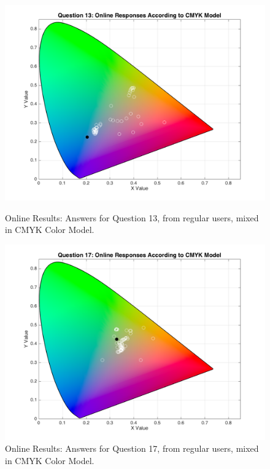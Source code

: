 \begin{figure}[!htbp]
  \centering
  \begin{minipage}{0.48\textwidth}
    \centering
    \includegraphics[width=\textwidth]{images/13_online_CMYKresponses.png}
    \caption[Online Results: Answers for Question 13, from regular users, mixed in CMYK Color Model.]{Online Results: Answers for Question 13, from regular users, mixed in CMYK Color Model.}
    \label{fig:onlinecmykregular_13}
  \end{minipage}\hfill
  \begin{minipage}{0.48\textwidth}
    \centering
    \includegraphics[width=\textwidth]{images/17_online_CMYKresponses.png}
    \caption[Online Results: Answers for Question 17, from regular users, mixed in CMYK Color Model.]{Online Results: Answers for Question 17, from regular users, mixed in CMYK Color Model.}
    \label{fig:onlinecmykregular_17}
  \end{minipage}
\end{figure}
